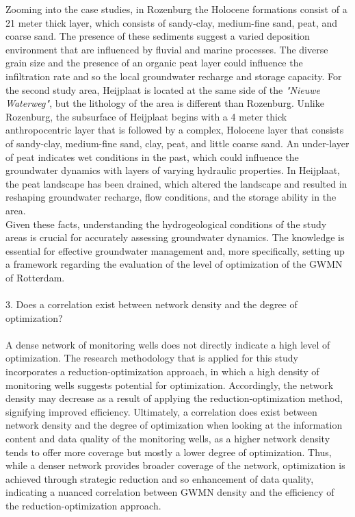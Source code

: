 Zooming into the case studies, in Rozenburg the Holocene formations consist of a 21 meter thick layer, which consists of sandy-clay, medium-fine sand, peat, and coarse sand. The presence of these sediments suggest a varied deposition environment that are influenced by fluvial and marine processes. The diverse grain size and the presence of an organic peat layer could influence the infiltration rate and so the local groundwater recharge and storage capacity. For the second study area, Heijplaat is located at the same side of the \textit{"Nieuwe Waterweg"}, but the lithology of the area is different than Rozenburg. Unlike Rozenburg, the subsurface of Heijplaat begins with a 4 meter thick anthropocentric layer that is followed by a complex, Holocene layer that consists of sandy-clay, medium-fine sand, clay, peat, and little coarse sand. An under-layer of peat indicates wet conditions in the past, which could influence the groundwater dynamics with layers of varying hydraulic properties. In Heijplaat, the peat landscape has been drained, which altered the landscape and resulted in reshaping groundwater recharge, flow conditions, and the storage ability in the area. \\
Given these facts, understanding the hydrogeological conditions of the study areas is crucial for accurately assessing groundwater dynamics. The knowledge is essential for effective groundwater management and, more specifically, setting up a framework regarding the evaluation of the level of optimization of the GWMN of Rotterdam.\\
\\
3. Does a correlation exist between network density and the degree of optimization? \\
\\
A dense network of monitoring wells does not directly indicate a high level of optimization. The research methodology that is applied for this study incorporates a reduction-optimization approach, in which a high density of monitoring wells suggests potential for optimization. Accordingly, the network density may decrease as a result of applying the reduction-optimization method, signifying improved efficiency. Ultimately, a correlation does exist between network density and the degree of optimization when looking at the information content and data quality of the monitoring wells, as a higher network density tends to offer more coverage but mostly a lower degree of optimization. Thus, while a denser network provides broader coverage of the network, optimization is achieved through strategic reduction and so enhancement of data quality, indicating a nuanced correlation between GWMN density and the efficiency of the reduction-optimization approach.\\
